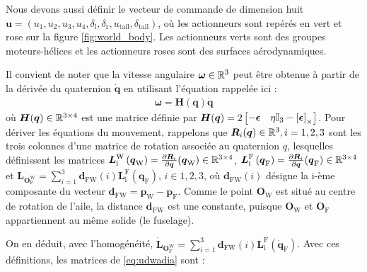 Nous devons aussi définir le vecteur de commande de dimension huit $\boldsymbol{u} = (u_{1},u_{2},u_{3},u_{4},\delta_{\text{l}},\delta_{\text{r}},u_{\text{tail}},\delta_{\text{tail}})$, où les actionneurs sont repérés en vert et rose sur la figure \ref{fig:world_body}. Les actionneurs verts sont des groupes moteurs-hélices et les actionneurs roses sont des surfaces aérodynamiques. 

Il convient de noter que la vitesse angulaire $\boldsymbol{\omega} \in {\mathbb R}^{3}$ peut être obtenue à partir de la dérivée du quaternion $\dot{\boldsymbol{q}}$ en utilisant l'équation \cite[équation (2.7)]{udwadia-schutte} rappelée ici : 
\begin{align*}
    \boldsymbol{\omega} = \boldsymbol{H}(\boldsymbol{q}) \dot{\boldsymbol{q}} 
\end{align*}
où $\boldsymbol{H}(\boldsymbol{q}) \in {\mathbb R}^{3\times4}$ est une matrice définie par $\boldsymbol{H}(\boldsymbol{q}) = 2\begin{bmatrix}-\boldsymbol{\epsilon} & \eta \mathbb{I}_{3} - \left[\boldsymbol{\epsilon}\right]_{\times}\end{bmatrix}$.
Pour dériver les équations du mouvement, rappelons que  $\boldsymbol{R}_{i}(\boldsymbol{q}) \in {\mathbb R}^{3}, i = 1,2,3$ sont les trois colonnes d'une matrice de rotation associée au quaternion $q$, lesquelles définissent les matrices $\boldsymbol{L}_{\text{i}}^{\text{W}} \left( \boldsymbol{q}_{\text{W}} \right) = \frac{\partial \boldsymbol{R}_{i}}{\partial \boldsymbol{q}}(\boldsymbol{q}_{\text{W}}) \in {\mathbb R}^{3\times4}$, 
$\boldsymbol{L}_{\text{i}}^{\text{F}} \left( \boldsymbol{q}_{\text{F}} \right) = \frac{\partial \boldsymbol{R}_{i}}{\partial \boldsymbol{q}}(\boldsymbol{q}_{\text{F}}) \in {\mathbb R}^{3\times4}$ et
$\boldsymbol{L}_{\boldsymbol{O}_{\text{F}}^{\text{W}}} = \sum_{i=1}^{3} \boldsymbol{d}_{\text{FW}}(i) \boldsymbol{L}_{\text{i}}^{\text{F}} (\boldsymbol{q}_{\text{F}})$, $i \in {1,2,3}$, où $\boldsymbol{d}_{\text{FW}}(i)$ désigne la i-ème composante du vecteur $\boldsymbol{d}_{\text{FW}} = \boldsymbol{p}_{\text{W}} - \boldsymbol{p}_{\text{F}}$. Comme le point $\boldsymbol{O}_{\text{W}}$ est situé au centre de rotation de l'aile, la distance $\boldsymbol{d}_{\text{FW}}$ est une constante, puisque $\boldsymbol{O}_{\text{W}}$ et $\boldsymbol{O}_{\text{F}}$ appartiennent au même solide (le fuselage).

On en déduit, avec l'homogénéité, $\dot{\boldsymbol{L}}_{\boldsymbol{O}_{\text{F}}^{\text{W}}} = \sum_{i=1}^{3} \boldsymbol{d}_{\text{FW}}(i) \boldsymbol{L}_{\text{i}}^{\text{F}} (\dot{\boldsymbol{q}}_{\text{F}})$. Avec ces définitions, les matrices de \eqref{eq:udwadia} sont :

